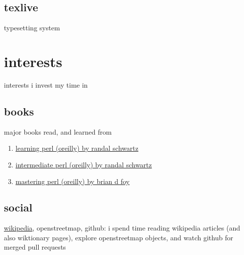 \documentclass{article}
\begin{document}
\subsection{texlive}
typesetting system
\section{interests}
interests i invest my time in
\subsection{books}
major books read, and learned from
\begin{enumerate}
\item \href{https://www.oreilly.com/library/view/learning-perl-7th/9781491954317/}{learning perl (oreilly) by randal schwartz}
\item \href{https://www.oreilly.com/library/view/intermediate-perl-2nd/9781449343781/}{intermediate perl (oreilly) by randal schwartz}
\item \href{https://www.oreilly.com/library/view/mastering-perl-2nd/9781449364946/}{mastering perl (oreilly) by brian d foy}
\end{enumerate}
\subsection{social}
\href{https://en.wikipedia.org/wiki/User:Rwp0}{wikipedia}, openstreetmap, github:
i spend time reading wikipedia articles (and also wiktionary pages), explore openstreetmap objects, and watch github for merged pull requests
\end{document}
